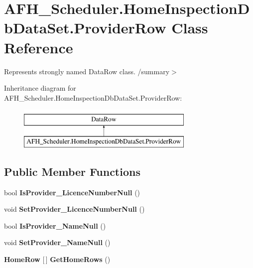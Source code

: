 \section{A\+F\+H\+\_\+\+Scheduler.\+Home\+Inspection\+Db\+Data\+Set.\+Provider\+Row Class Reference}
\label{class_a_f_h___scheduler_1_1_home_inspection_db_data_set_1_1_provider_row}


Represents strongly named Data\+Row class. /summary$>$  


Inheritance diagram for A\+F\+H\+\_\+\+Scheduler.\+Home\+Inspection\+Db\+Data\+Set.\+Provider\+Row\+:\begin{figure}[H]
\begin{center}
\leavevmode
\includegraphics[height=2.000000cm]{class_a_f_h___scheduler_1_1_home_inspection_db_data_set_1_1_provider_row}
\end{center}
\end{figure}
\subsection*{Public Member Functions}
\begin{DoxyCompactItemize}
\item 
\mbox{\label{class_a_f_h___scheduler_1_1_home_inspection_db_data_set_1_1_provider_row_a52acf610b8b30f99b1b7b49df4f701a7}} 
bool {\bfseries Is\+Provider\+\_\+\+Licence\+Number\+Null} ()
\item 
\mbox{\label{class_a_f_h___scheduler_1_1_home_inspection_db_data_set_1_1_provider_row_a0950673f0402fc95d07847d47ffec037}} 
void {\bfseries Set\+Provider\+\_\+\+Licence\+Number\+Null} ()
\item 
\mbox{\label{class_a_f_h___scheduler_1_1_home_inspection_db_data_set_1_1_provider_row_a497ffad361fa832ce269be3c652a8c0a}} 
bool {\bfseries Is\+Provider\+\_\+\+Name\+Null} ()
\item 
\mbox{\label{class_a_f_h___scheduler_1_1_home_inspection_db_data_set_1_1_provider_row_a54806006ea468a29139ed9a221b93683}} 
void {\bfseries Set\+Provider\+\_\+\+Name\+Null} ()
\item 
\mbox{\label{class_a_f_h___scheduler_1_1_home_inspection_db_data_set_1_1_provider_row_a0bcdf5a24a14228a785583465505e895}} 
\textbf{ Home\+Row} [$\,$] {\bfseries Get\+Home\+Rows} ()
\end{DoxyCompactItemize}
